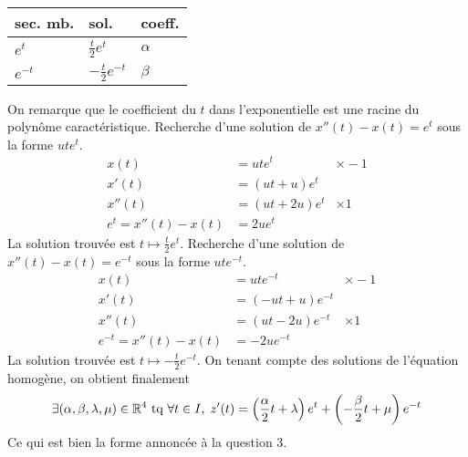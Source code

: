 \begin{enumerate}
\begin{enumerate}
\begin{center}
\renewcommand{\arraystretch}{1.8}
\begin{tabular}{|l|l|l|} \hline
sec. mb. & sol.                 & coeff.\\   \hline
$e^{t}$  & $\frac{t}{2}e^{t}$   & $\alpha$\\ \hline
$e^{-t}$  & $-\frac{t}{2}e^{-t}$ & $\beta$\\  \hline
\end{tabular}
\end{center}
On remarque que le coefficient du $t$ dans l'exponentielle est une racine du polynôme caractéristique.\newline
Recherche d'une solution de $x''(t) - x(t) = e^t$ sous la forme $ute^t$. 
\begin{align*}
  x(t) &= ute^{t} &\times -1\\
  x'(t) &= (ut +u)e^{t} \\
  x''(t) &= (ut +2u)e^{t} &\times 1 \\ \hline
e^{t}=x''(t) -x(t) &= 2u e^{t}  
\end{align*}
La solution trouvée est $t\mapsto \frac{t}{2}e^{t}$. \newline
Recherche d'une solution de $x''(t) - x(t) = e^{-t}$ sous la forme $ute^{-t}$. 
\begin{align*}
  x(t) &= ute^{-t} &\times -1\\
  x'(t) &= (-ut +u)e^{-t} \\
  x''(t) &= (ut -2u)e^{-t} &\times 1 \\ \hline
e^{-t}=x''(t) -x(t) &= -2u e^{-t}  
\end{align*}
La solution trouvée est $t\mapsto -\frac{t}{2}e^{-t}$. \newline
On tenant compte des solutions de l'équation homogène, on obtient finalement
\begin{displaymath}
\exists (\alpha, \beta, \lambda, \mu)\in \mathbb{R}^4 \text{ tq }
\forall t \in I,\;  z'(t) = \left( \frac{\alpha}{2}t + \lambda\right) e^{t} + \left( -\frac{\beta}{2}t + \mu\right) e^{-t}
\end{displaymath}
Ce qui est bien la forme annoncée à la question 3.
\end{enumerate}
  

\end{enumerate}
